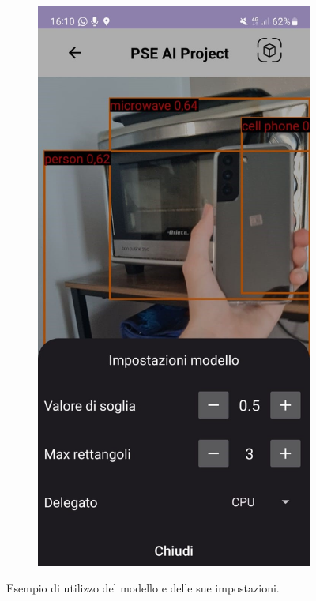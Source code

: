 \begin{figure}[ht]
\begin{subfigure}[b]{0.3\textwidth}
    \end{subfigure}
    \begin{subfigure}[b]{0.3\textwidth}
      \includegraphics[width=\textwidth, height=0.45\textheight]{Immagini/App/funzionamento_impostazioni.jpeg}
    \end{subfigure}
    \caption{Esempio di utilizzo del modello e delle sue impostazioni.}
    \label{fig:funzionamento1}
\end{figure}

